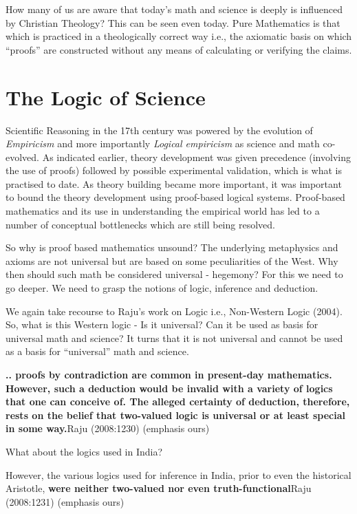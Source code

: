 How many of us are aware that today’s math and science is deeply is influenced by Christian Theology? This can be seen even today. Pure Mathematics is that which is practiced in a theologically correct way i.e., the axiomatic basis on which “proofs” are constructed without any means of calculating or verifying the claims.


\section*{The Logic of Science}

Scientific Reasoning in the 17th century was powered by the evolution of \textit{Empiricism} and more importantly \textit{Logical empiricism} as science and math co-evolved. As indicated earlier, theory development was given precedence (involving the use of proofs) followed by possible experimental validation, which is what is practised to date. As theory building became more important, it was important to bound the theory development using proof-based logical systems. Proof-based mathematics and its use in understanding the empirical world has led to a number of conceptual bottlenecks which are still being resolved.

\newpage

So why is proof based mathematics unsound? The underlying metaphysics and axioms are not universal but are based on some peculiarities of the West. Why then should such math be considered universal - hegemony? For this we need to go deeper. We need to grasp the notions of logic, inference and deduction.

We again take recourse to Raju’s work on Logic i.e., Non-Western Logic (2004). So, what is this Western logic - Is it universal? Can it be used as basis for universal math and science? It turns that it is not universal and cannot be used as a basis for “universal” math and science.

\begin{myquote}
\textbf{.. proofs by contradiction are common in present-day mathematics. However, such a deduction would be invalid with a variety of logics that one can conceive of. The alleged certainty of deduction, therefore, rests on the belief that two-valued logic is universal or at least special in some way.}\hfill Raju (2008:1230) (emphasis ours)
\end{myquote}

What about the logics used in India?

\begin{myquote}
However, the various logics used for inference in India, prior to even the historical Aristotle, \textbf{were neither two-valued nor even\general{\break } truth-functional}\hfill Raju (2008:1231) (emphasis ours)
\end{myquote}

